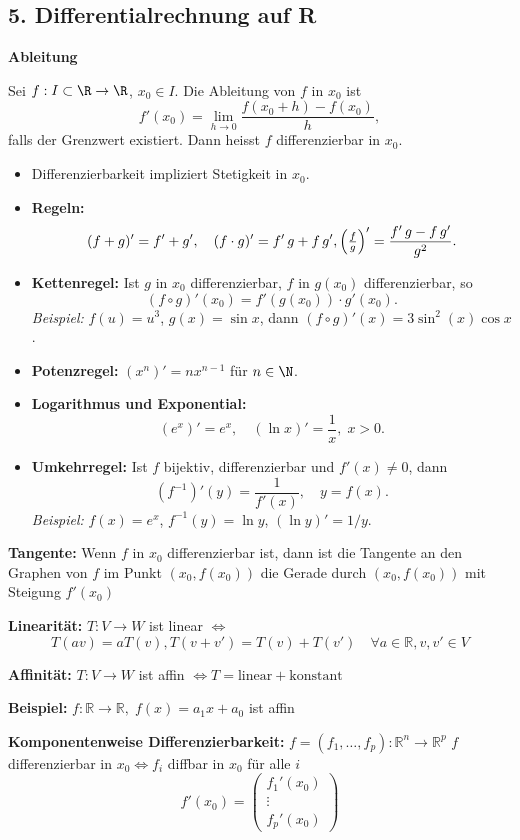 \begin{itemize}
\subsection{5. Differentialrechnung auf R}
\textbf{Ableitung}
\begin{definition}
  Sei $f:I\subset\R\to\R$, $x_0\in I$. Die Ableitung von $f$ in $x_0$ ist
  \[
    f'(x_0) = \lim_{h\to0} \frac{f(x_0 + h) - f(x_0)}{h},
  \]
  falls der Grenzwert existiert. Dann heisst $f$ differenzierbar in $x_0$.
\end{definition}
\begin{itemize}
  \item Differenzierbarkeit impliziert Stetigkeit in $x_0$.
  \item \textbf{Regeln:}
    \[
      (f+g)' = f' + g', \quad 
      (f\cdot g)' = f'\,g + f\,g', \quad \\
      \Bigl(\tfrac{f}{g}\Bigr)' = \frac{f'\,g - f\,g'}{g^2}.
    \]
  \item \textbf{Kettenregel:} Ist $g$ in $x_0$ differenzierbar, $f$ in $g(x_0)$ differenzierbar, so
    \[
      (f\circ g)'(x_0) = f'(g(x_0)) \cdot g'(x_0).
    \]
    \emph{Beispiel:} $f(u)=u^3$, $g(x)=\sin x$, dann $(f\circ g)'(x)=3\sin^2(x)\cos x$.
  \item \textbf{Potenzregel:} $(x^n)' = n x^{n-1}$ für $n\in\N$.
  \item \textbf{Logarithmus und Exponential:}  
    \[
      (e^x)' = e^x,\quad (\ln x)' = \frac{1}{x},\; x>0.
    \]
  \item \textbf{Umkehrregel:} Ist $f$ bijektiv, differenzierbar und $f'(x)\ne0$, dann
    \[
      (f^{-1})'(y) = \frac{1}{f'(x)},\quad y = f(x).
    \]
    \emph{Beispiel:} $f(x)=e^x$, $f^{-1}(y)=\ln y$, $(\ln y)' = 1/y$.
\end{itemize}

\textbf{Tangente:}  
Wenn \(f\) in \(x_0\) differenzierbar ist, dann ist die Tangente an den Graphen von \(f\) im Punkt \((x_0, f(x_0))\)  
die Gerade durch \((x_0, f(x_0))\) mit Steigung \(f'(x_0)\)

\textbf{Linearität:}  
\(T: V \to W\) ist linear \(\Leftrightarrow\)  
\[
T(av) = aT(v), T(v + v') = T(v) + T(v')\quad \forall a \in \mathbb{R}, v, v' \in V
\]

\textbf{Affinität:}  
\(T: V \to W\) ist affin \(\Leftrightarrow T = \text{linear} + \text{konstant}\)

\textbf{Beispiel:} \(f: \mathbb{R} \to \mathbb{R},\; f(x) = a_1 x + a_0\) ist affin

\textbf{Komponentenweise Differenzierbarkeit:}  
\(f = (f_1, \dots, f_p): \mathbb{R}^n \to \mathbb{R}^p\)  
\(f\) differenzierbar in \(x_0 \Leftrightarrow f_i\) diffbar in \(x_0\) für alle \(i\)  
\[
f'(x_0) = \begin{pmatrix} f_1'(x_0) \\ \vdots \\ f_p'(x_0) \end{pmatrix}
\]


\end{itemize}
